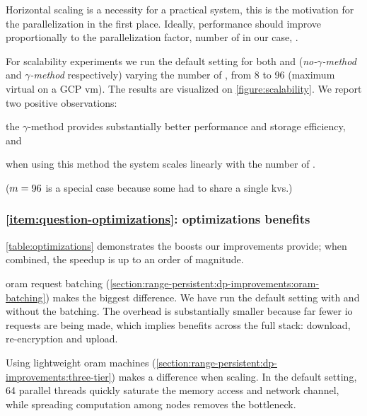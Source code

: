 			Horizontal scaling is a necessity for a practical system, this is the motivation for the parallelization in the first place.
			Ideally, performance should improve proportionally to the parallelization factor, number of  in our case, \oramsNumber{}.

			For scalability experiments we run the default setting for both \protocolNoGamma{} and \protocolGamma{} (\emph{no-$\gamma$-method} and \emph{$\gamma$-method} respectively) varying the number of  \oramsNumber{}, from 8 to 96 (maximum virtual  on a GCP \acrshort{vm}).
			The results are visualized on \cref{figure:scalability}.
			We report two positive observations:
			\begin{enumerate*}[label={(\roman*)}]
				\item the $\gamma$-method provides substantially better performance and storage efficiency, and
				\item when using this method the system scales linearly with the number of .
			\end{enumerate*}
			($m = 96$ is a special case because some  had to share a single \acrshort{kvs}.)

		\subsubsection*{\textbf{\texorpdfstring{\ref{item:question-optimizations}:}{} optimizations benefits}}

			

			\cref{table:optimizations} demonstrates the boosts our improvements provide; when combined, the speedup is up to an order of magnitude.

			\acrshort{oram} request batching (\cref{section:range-persistent:dp-improvements:oram-batching}) makes the biggest difference.
			We have run the default setting with and without the batching.
			The overhead is substantially smaller because far fewer \acrshort{io} requests are being made, which implies benefits across the full stack: download, re-encryption and upload.

			Using lightweight \acrshort{oram} machines (\cref{section:range-persistent:dp-improvements:three-tier}) makes a difference when scaling.
			In the default setting, 64 parallel threads quickly saturate the memory access and network channel, while spreading computation among nodes removes the bottleneck.

